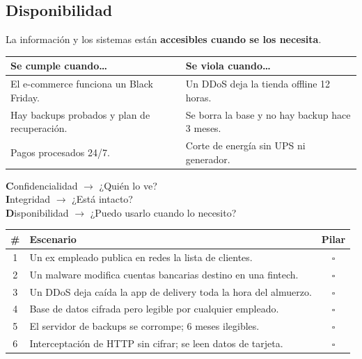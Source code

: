 \documentclass[12pt,a4paper]{article}
\renewcommand{\arraystretch}{1.25}
\newcommand{\checkboxVacio}{$\square$\;}
\begin{document}
\subsection{Disponibilidad}
\begin{cajaDefinicion}
La informaci\'on y los sistemas est\'an \textbf{accesibles cuando se los necesita}.
\end{cajaDefinicion}

\renewcommand{\arraystretch}{1.5}
\begin{tabularx}{\textwidth}{XX}
\toprule
\textbf{Se cumple cuando\ldots} & \textbf{Se viola cuando\ldots} \\
\midrule
El e-commerce funciona un Black Friday. &
Un DDoS deja la tienda offline 12 horas. \\[4pt]
Hay backups probados y plan de recuperaci\'on. &
Se borra la base y no hay backup hace 3 meses. \\[4pt]
Pagos procesados 24/7. &
Corte de energ\'ia sin UPS ni generador. \\
\bottomrule
\end{tabularx}

\begin{tcolorbox}[colback=doradoUCA!10, colframe=doradoUCA,
                  title=Regla mnemot\'ecnica, arc=3mm]
\begin{center}
\textbf{C}onfidencialidad $\rightarrow$ ¿Qui\'en lo ve?\\[4pt]
\textbf{I}ntegridad $\rightarrow$ ¿Est\'a intacto?\\[4pt]
\textbf{D}isponibilidad $\rightarrow$ ¿Puedo usarlo cuando lo necesito?
\end{center}
\end{tcolorbox}

\begin{cajaActividad}[title={\ding{45}\; Ejercicio r\'apido --- Marc\'a con C, I o D}]
\vspace{4pt}
\renewcommand{\arraystretch}{1.8}
\begin{tabularx}{\textwidth}{|c|X|c|}
\hline
\textbf{\#} & \textbf{Escenario} & \textbf{Pilar} \\
\hline
1 & Un ex empleado publica en redes la lista de clientes. & \checkboxVacio \\
\hline
2 & Un malware modifica cuentas bancarias destino en una fintech. & \checkboxVacio \\
\hline
3 & Un DDoS deja ca\'ida la app de delivery toda la hora del almuerzo. & \checkboxVacio \\
\hline
4 & Base de datos cifrada pero legible por cualquier empleado. & \checkboxVacio \\
\hline
5 & El servidor de backups se corrompe; 6 meses ilegibles. & \checkboxVacio \\
\hline
6 & Interceptaci\'on de HTTP sin cifrar; se leen datos de tarjeta. & \checkboxVacio \\
\hline
\end{tabularx}
\end{cajaActividad}
\end{document}
